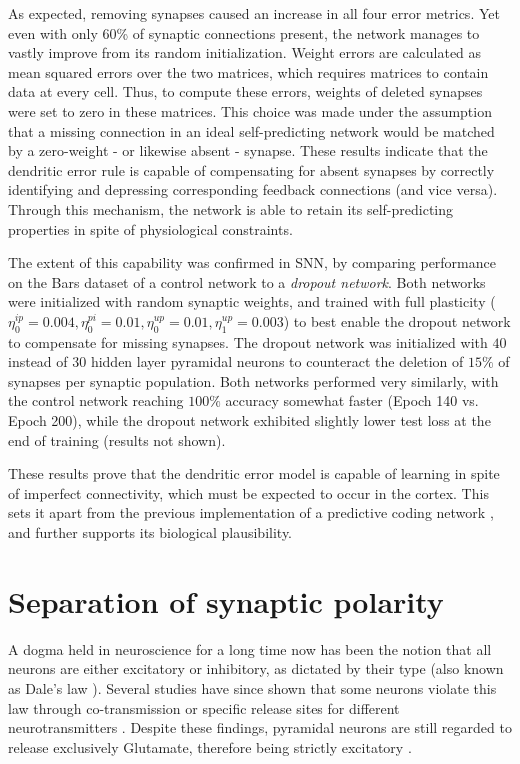 As expected, removing synapses caused an increase in all four error metrics. Yet even with only 60\% of synaptic
connections present, the network manages to vastly improve from its random initialization. Weight errors are calculated
as mean squared errors over the two matrices, which requires matrices to contain data at every cell. Thus, to compute
these errors, weights of deleted synapses were set to zero in these matrices. This choice was made under the assumption
that a missing connection in an ideal self-predicting network would be matched by a zero-weight - or likewise absent -
synapse. These results indicate that the dendritic error rule is capable of compensating for absent synapses by
correctly identifying and depressing corresponding feedback connections (and vice versa). Through this mechanism, the
network is able to retain its self-predicting properties in spite of physiological constraints.


The extent of this capability was confirmed in SNN, by comparing performance on the Bars dataset of a control network to
a \textit{dropout network}. Both networks were initialized with random synaptic weights, and trained with full
plasticity ($\eta^{ip}_0 = 0.004, \eta^{pi}_0 = 0.01, \eta^{up}_0 = 0.01, \eta^{up}_1 = 0.003$) to best enable the
dropout network to compensate for missing synapses. The dropout network was initialized with $40$ instead of $30$ hidden
layer pyramidal neurons to counteract the deletion of $15\%$ of synapses per synaptic population. Both networks
performed very similarly, with the control network reaching $100\%$ accuracy somewhat faster (Epoch 140 vs. Epoch 200),
while the dropout network exhibited slightly lower test loss at the end of training (results not shown).

These results prove that the dendritic error model is capable of learning in spite of imperfect connectivity, which must
be expected to occur in the cortex. This sets it apart from the previous implementation of a predictive coding network
\citep{Whittington2017}, and further supports its biological plausibility.



\section{Separation of synaptic polarity}


A dogma held in neuroscience for a long time now has been the notion that all neurons are either excitatory or
inhibitory, as dictated by their type (also known as Dale's law \citep{Kandel1968}). Several studies have since shown
that some neurons violate this law through co-transmission or specific release sites for different neurotransmitters
\citep{Svensson2019,Barranca2022}. Despite these findings, pyramidal neurons are still regarded to release exclusively
Glutamate, therefore being strictly excitatory \citep{gerfen2018long,spruston2008pyramidal,Eyal2018}.



